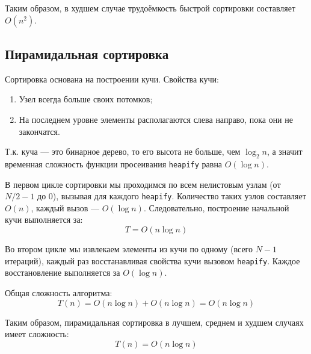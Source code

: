 \documentclass[otchet]{SCWorks}
\begin{document}
Таким образом, в худшем случае трудоёмкость быстрой сортировки составляет $O(n^2)$.

\subsection{Пирамидальная сортировка}

Сортировка основана на построении кучи. Свойства кучи:
\begin{enumerate}
    \item Узел всегда больше своих потомков;
    \item На последнем уровне элементы располагаются слева направо, пока они не закончатся.
\end{enumerate}

Т.к. куча — это бинарное дерево, то его высота не больше, чем $\log_2 n$, а значит временная сложность функции просеивания \texttt{heapify} равна $O(\log n)$.

В первом цикле сортировки мы проходимся по всем нелистовым узлам (от $N/2 - 1$ до $0$), вызывая для каждого \texttt{heapify}. Количество таких узлов составляет $O(n)$, каждый вызов — $O(\log n)$. Следовательно, построение начальной кучи выполняется за:
\[
T = O(n \log n)
\]

Во втором цикле мы извлекаем элементы из кучи по одному (всего $N-1$ итераций), каждый раз восстанавливая свойства кучи вызовом \texttt{heapify}. Каждое восстановление выполняется за $O(\log n)$.

Общая сложность алгоритма:
\[
T(n) = O(n \log n) + O(n \log n) = O(n \log n)
\]

Таким образом, пирамидальная сортировка в лучшем, среднем и худшем случаях имеет сложность:
\[
T(n) = O(n \log n)
\]
\end{document}
